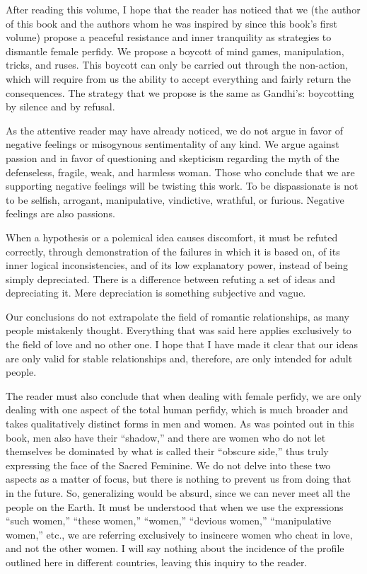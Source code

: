 
\par After reading this volume, I hope that the reader has noticed that we (the author of this book and the authors whom he was inspired by since this book's first volume) propose a peaceful resistance and inner tranquility as strategies to dismantle female perfidy. We propose a boycott of mind games, manipulation, tricks, and ruses. This boycott can only be carried out through the non-action, which will require from us the ability to accept everything and fairly return the consequences. The strategy that we propose is the same as Gandhi's: boycotting by silence and by refusal.

\par As the attentive reader may have already noticed, we do not argue in favor of negative feelings or misogynous sentimentality of any kind. We argue against passion and in favor of questioning and skepticism regarding the myth of the defenseless, fragile, weak, and harmless woman. Those who conclude that we are supporting negative feelings will be twisting this work. To be dispassionate is not to be selfish, arrogant, manipulative, vindictive, wrathful, or furious. Negative feelings are also passions.

\par When a hypothesis or a polemical idea causes discomfort, it must be refuted correctly, through demonstration of the failures in which it is based on, of its inner logical inconsistencies, and of its low explanatory power, instead of being simply depreciated. There is a difference between refuting a set of ideas and depreciating it. Mere depreciation is something subjective and vague.

\par Our conclusions do not extrapolate the field of romantic relationships, as many people mistakenly thought. Everything that was said here applies exclusively to the field of love and no other one. I hope that I have made it clear that our ideas are only valid for stable relationships and, therefore, are only intended for adult people.

\par The reader must also conclude that when dealing with female perfidy, we are only dealing with one aspect of the total human perfidy, which is much broader and takes qualitatively distinct forms in men and women. As was pointed out in this book, men also have their \enquote{shadow,} and there are women who do not let themselves be dominated by what is called their \enquote{obscure side,} thus truly expressing the face of the Sacred Feminine. We do not delve into these two aspects as a matter of focus, but there is nothing to prevent us from doing that in the future. So, generalizing would be absurd, since we can never meet all the people on the Earth. It must be understood that when we use the expressions \enquote{such women,} \enquote{these women,} \enquote{women,} \enquote{devious women,} \enquote{manipulative women,} etc., we are referring exclusively to insincere women who cheat in love, and not the other women. I will say nothing about the incidence of the profile outlined here in different countries, leaving this inquiry to the reader.